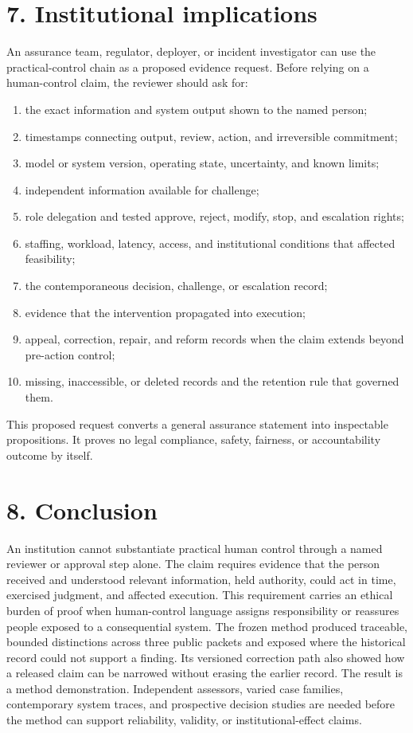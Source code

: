 \documentclass[11pt]{article}
\begin{document}
\section*{7. Institutional implications}
An assurance team, regulator, deployer, or incident investigator can use the practical-control chain as a proposed evidence request. Before relying on a human-control claim, the reviewer should ask for:
\begin{enumerate}[leftmargin=*]
\item the exact information and system output shown to the named person;
\item timestamps connecting output, review, action, and irreversible commitment;
\item model or system version, operating state, uncertainty, and known limits;
\item independent information available for challenge;
\item role delegation and tested approve, reject, modify, stop, and escalation rights;
\item staffing, workload, latency, access, and institutional conditions that affected feasibility;
\item the contemporaneous decision, challenge, or escalation record;
\item evidence that the intervention propagated into execution;
\item appeal, correction, repair, and reform records when the claim extends beyond pre-action control;
\item missing, inaccessible, or deleted records and the retention rule that governed them.
\end{enumerate}
This proposed request converts a general assurance statement into inspectable propositions. It proves no legal compliance, safety, fairness, or accountability outcome by itself.
\FloatBarrier
\section*{8. Conclusion}
An institution cannot substantiate practical human control through a named reviewer or approval step alone. The claim requires evidence that the person received and understood relevant information, held authority, could act in time, exercised judgment, and affected execution. This requirement carries an ethical burden of proof when human-control language assigns responsibility or reassures people exposed to a consequential system. The frozen method produced traceable, bounded distinctions across three public packets and exposed where the historical record could not support a finding. Its versioned correction path also showed how a released claim can be narrowed without erasing the earlier record.
The result is a method demonstration. Independent assessors, varied case families, contemporary system traces, and prospective decision studies are needed before the method can support reliability, validity, or institutional-effect claims.
\FloatBarrier
\end{document}
